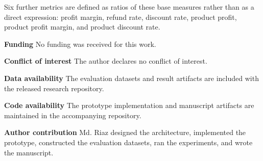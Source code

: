 \documentclass[pdflatex,sn-mathphys-num]{sn-jnl}
\begin{document}
Six further metrics are defined as ratios of these base measures rather than as a direct expression: profit margin, refund rate, discount rate, product profit, product profit margin, and product discount rate.



        \textbf{Funding} No funding was received for this work.

        \textbf{Conflict of interest} The author declares no conflict of interest.

        \textbf{Data availability} The evaluation datasets and result artifacts are included with the released research repository.

        \textbf{Code availability} The prototype implementation and manuscript artifacts are maintained in the accompanying repository.

        \textbf{Author contribution} Md. Riaz designed the architecture, implemented the prototype, constructed the evaluation datasets, ran the experiments, and wrote the manuscript.

        

        
\end{document}
